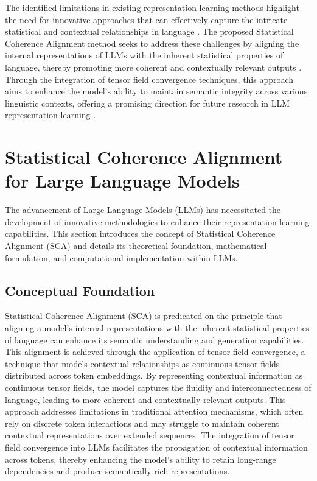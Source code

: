 \documentclass{article}
\begin{document}
The identified limitations in existing representation learning methods highlight the need for innovative approaches that can effectively capture the intricate statistical and contextual relationships in language \cite{lodin2024dynamic}. The proposed Statistical Coherence Alignment method seeks to address these challenges by aligning the internal representations of LLMs with the inherent statistical properties of language, thereby promoting more coherent and contextually relevant outputs \cite{grushail2024adaptive}. Through the integration of tensor field convergence techniques, this approach aims to enhance the model's ability to maintain semantic integrity across various linguistic contexts, offering a promising direction for future research in LLM representation learning \cite{verscaj2024innovative}.



\section{Statistical Coherence Alignment for Large Language Models}

The advancement of Large Language Models (LLMs) has necessitated the development of innovative methodologies to enhance their representation learning capabilities. This section introduces the concept of Statistical Coherence Alignment (SCA) and details its theoretical foundation, mathematical formulation, and computational implementation within LLMs.

\subsection{Conceptual Foundation}

Statistical Coherence Alignment (SCA) is predicated on the principle that aligning a model's internal representations with the inherent statistical properties of language can enhance its semantic understanding and generation capabilities. This alignment is achieved through the application of tensor field convergence, a technique that models contextual relationships as continuous tensor fields distributed across token embeddings. By representing contextual information as continuous tensor fields, the model captures the fluidity and interconnectedness of language, leading to more coherent and contextually relevant outputs. This approach addresses limitations in traditional attention mechanisms, which often rely on discrete token interactions and may struggle to maintain coherent contextual representations over extended sequences. The integration of tensor field convergence into LLMs facilitates the propagation of contextual information across tokens, thereby enhancing the model's ability to retain long-range dependencies and produce semantically rich representations.
\end{document}
